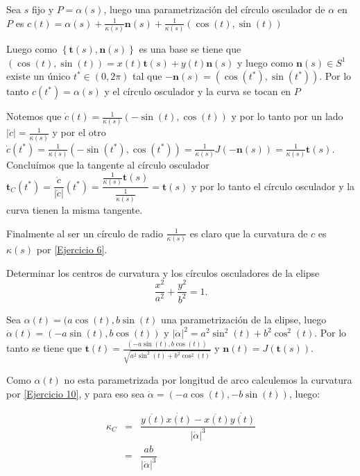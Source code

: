 \documentclass[11pt]{article}
\newcommand\abs[1]{\left\lvert#1\right\rvert}
\renewcommand\tt{\mathbf{t}}
\newcommand\nn{\mathbf{n}}
\newcommand{\sett}[1]{\left\lbrace#1\right\rbrace}
\newenvironment{proof}[1][Demostraci\'on]{\begin{trivlist}
		\item[\hskip \labelsep {\bfseries #1}]}{\end{trivlist}}
\newcommand{\qed}{\nobreak \ifvmode \relax \else
	\ifdim\lastskip<1.5em \hskip-\lastskip
	\hskip1.5em plus0em minus0.5em \fi \nobreak
	\vrule height0.75em width0.5em depth0.25em\fi}
\begin{document}
\begin{enumerate}
	\begin{proof}
		
		Sea $s$ fijo y $P = \alpha(s)$, luego una parametrizaci\'on del c\'irculo osculador de $\alpha$ en $P$ es $c(t) = \alpha(s) + \frac{1}{\kappa(s)}\nn(s) + \frac{1}{\kappa(s)}(\cos(t), \sin(t))$
		
		Luego como $\sett{\tt(s), \nn(s)}$ es una base se tiene que $(\cos(t),\sin(t)) = x(t)\tt(s) + y(t)\nn(s)$ y luego como $\nn(s) \in S^1$ existe un \'unico $t^* \in (0 , 2\pi)$ tal que $-\nn(s) = (\cos(t^*), \sin(t^*))$. Por lo tanto $c(t^*) = \alpha(s)$ y el c\'irculo osculador y la curva se tocan en $P$
		
		Notemos que $\dot{c}(t) =  \frac{1}{\kappa(s)}(-\sin(t), \cos(t))$ y por lo tanto por un lado $\abs{\dot{c}}= \frac{1}{\kappa(s)}$ y por el otro $\dot{c}( t^*) =  \frac{1}{\kappa(s)}(-\sin(t^*), \cos(t^*)) =  \frac{1}{\kappa(s)}J(-\nn(s)) =  \frac{1}{\kappa(s)}\tt(s)$. Conclu\'imos que la tangente al c\'irculo osculador $\tt_C(t^*) = \dfrac{\dot{c}}{\abs{\dot{c}}} (t^*) = \dfrac{\frac{1}{\kappa(s)}\tt(s)}{\frac{1}{\kappa(s)}} = \tt(s)$ y por lo tanto el c\'irculo osculador y la curva tienen la misma tangente.
		
		Finalmente al ser un c\'irculo de radio $\frac{1}{\kappa(s)}$ es claro que la curvatura de $c$ es $\kappa(s)$ por \ref{Ejercicio 6}. \qed
		
	\end{proof}
	
	\item Determinar los centros de curvatura y los c\'irculos osculadores de la elipse 
	\[
	\frac{x^2}{a^2}+\frac{y^2}{b^2}=1.
	\]
	
	Sea $\alpha(t) = (a\cos(t), b \sin(t)$ una parametrizaci\'on de la elipse, luego $\dot{\alpha}(t) = (-a\sin(t), b\cos(t))$ y $\abs{\dot{\alpha}}^2 = a^2 \sin^2(t) + b^2 \cos^2(t)$. Por lo tanto se tiene que $\tt(t) =  \frac{(-a\sin(t), b\cos(t))}{\sqrt{a^2 \sin^2(t) + b^2 \cos^2(t)}}$ y $\nn(t) = J(\tt(s))$.
	
	Como $\alpha(t)$ no esta parametrizada por longitud de arco calculemos la curvatura por \ref{Ejercicio 10}, y para eso sea $\ddot{\alpha} = (-a\cos(t), - b\sin(t))$, luego:
	
	\[
	\begin{array}{ccc}
	\kappa_C & = & \dfrac{\ddot{y(t)}\dot{x(t)} - \ddot{x(t)}\dot{y(t)}}{\abs{\dot{\alpha}}^3} \\ 
	& = & \dfrac{ab}{\abs{\dot{\alpha}}^3} 
	\end{array} 
	\]
	

\end{enumerate}
\end{document}
